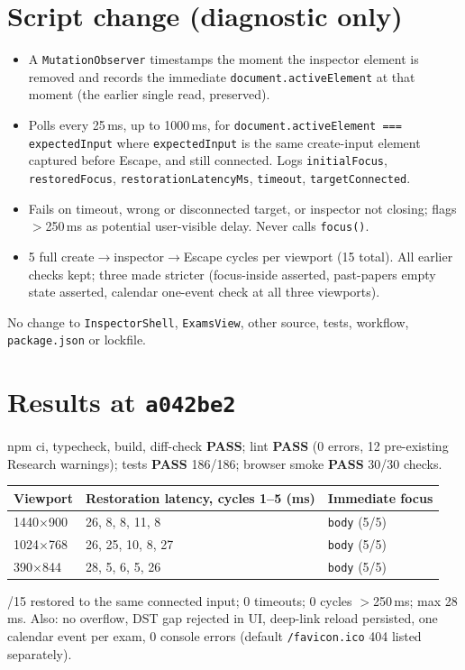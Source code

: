 \documentclass[11pt,a4paper]{article}
\newcommand{\sha}[1]{\texttt{\small #1}}
\newcommand{\PASS}{\textcolor{green!50!black}{\textbf{PASS}}}
\begin{document}
\section{Script change (diagnostic only)}
\begin{itemize}[nosep]
  \item A \texttt{MutationObserver} timestamps the moment the inspector element is removed and records the immediate \texttt{document.activeElement} at that moment (the earlier single read, preserved).
  \item Polls every 25\,ms, up to 1000\,ms, for \texttt{document.activeElement === expectedInput} where \texttt{expectedInput} is the same create-input element captured before Escape, and still connected. Logs \texttt{initialFocus}, \texttt{restoredFocus}, \texttt{restorationLatencyMs}, \texttt{timeout}, \texttt{targetConnected}.
  \item Fails on timeout, wrong or disconnected target, or inspector not closing; flags $>$250\,ms as potential user-visible delay. Never calls \texttt{focus()}.
  \item 5 full create$\to$inspector$\to$Escape cycles per viewport (15 total). All earlier checks kept; three made stricter (focus-inside asserted, past-papers empty state asserted, calendar one-event check at all three viewports).
\end{itemize}
No change to \texttt{InspectorShell}, \texttt{ExamsView}, other source, tests, workflow, \texttt{package.json} or lockfile.

\section{Results at \sha{a042be2}}
npm ci, typecheck, build, diff-check \PASS; lint \PASS{} (0 errors, 12 pre-existing Research warnings); tests \PASS{} 186/186; browser smoke \PASS{} 30/30 checks.

\begin{tabularx}{\textwidth}{@{}lXl@{}}
\toprule
Viewport & Restoration latency, cycles 1--5 (ms) & Immediate focus \\
\midrule
1440$\times$900 & 26, 8, 8, 11, 8 & \texttt{body} (5/5) \\
1024$\times$768 & 26, 25, 10, 8, 27 & \texttt{body} (5/5) \\
390$\times$844 & 28, 5, 6, 5, 26 & \texttt{body} (5/5) \\
\bottomrule
\end{tabularx}
/15 restored to the same connected input; 0 timeouts; 0 cycles $>$250\,ms; max 28\,ms. Also: no overflow, DST gap rejected in UI, deep-link reload persisted, one calendar event per exam, 0 console errors (default \texttt{/favicon.ico} 404 listed separately).
\end{document}
